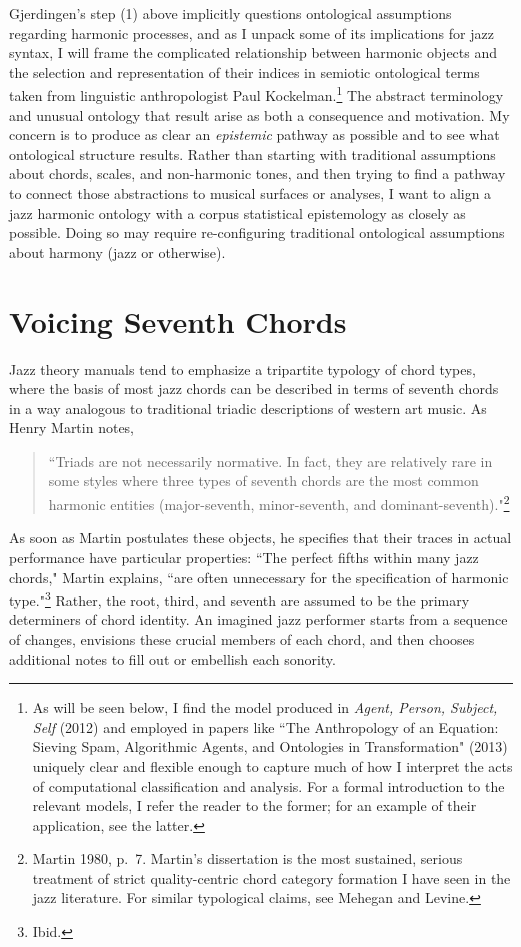 Gjerdingen's step (1) above implicitly questions ontological assumptions regarding harmonic processes, and as I unpack some of its implications for jazz syntax, I will frame the complicated relationship between harmonic objects and the selection and representation of their indices in semiotic ontological terms taken from linguistic anthropologist Paul Kockelman.\footnote{As will be seen below, I find the model produced in \emph{Agent, Person, Subject, Self} (2012) and employed in papers like ``The Anthropology of an Equation: Sieving Spam, Algorithmic Agents, and Ontologies in Transformation" (2013) uniquely clear and flexible enough to capture much of how I interpret the acts of computational classification and analysis.  For a formal introduction to the relevant models, I refer the reader to the former; for an example of their application, see the latter.} The abstract terminology and unusual ontology that result arise as both a consequence and motivation.  My concern is to produce as clear an \emph{epistemic} pathway as possible and to see what ontological structure results.  Rather than starting with traditional assumptions about chords, scales, and non-harmonic tones, and then trying to find a pathway to connect those abstractions to musical surfaces or analyses, I want to align a jazz harmonic ontology with a corpus statistical epistemology as closely as possible.  Doing so may require re-configuring traditional ontological assumptions about harmony (jazz or otherwise).

\section{Voicing Seventh Chords}
Jazz theory manuals tend to emphasize a tripartite typology of chord types, where the basis of most jazz chords can be described in terms of seventh chords in a way analogous to traditional triadic descriptions of western art music.  As Henry Martin notes,
\begin{quote}
``Triads are not necessarily normative.  In fact, they are relatively rare in some styles where three types of seventh chords are the most common harmonic entities (major-seventh, minor-seventh, and dominant-seventh)."\footnote{Martin 1980, p.\ 7.  Martin's dissertation is the most sustained, serious treatment of strict quality-centric chord category formation I have seen in the jazz literature.  For similar typological claims, see Mehegan and Levine.}
\end{quote}
As soon as Martin postulates these objects, he specifies that their traces in actual performance have particular properties: ``The perfect fifths within many jazz chords," Martin explains, ``are often unnecessary for the specification of harmonic type."\footnote{Ibid.}  Rather, the root, third, and seventh are assumed to be the primary determiners of chord identity.  An imagined jazz performer starts from a sequence of changes, envisions these crucial members of each chord, and then chooses additional notes to fill out or embellish each sonority.

